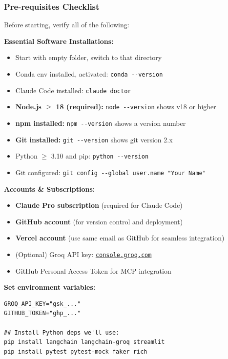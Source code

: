 \begin{frame}[fragile]\frametitle{Pre-requisites Checklist}
Before starting, verify all of the following:

\textbf{Essential Software Installations:}
  \begin{itemize}
    \item Start with empty folder, switch to that directory
    \item Conda env installed, activated: \lstinline|conda --version|
    \item Claude Code installed: \lstinline|claude doctor|
    \item \textbf{Node.js $\geq$ 18 (required):} \lstinline|node --version| shows v18 or higher
    \item \textbf{npm installed:} \lstinline|npm --version| shows a version number
    \item \textbf{Git installed:} \lstinline|git --version| shows git version 2.x
    \item Python $\geq$ 3.10 and pip: \lstinline|python --version|
    \item Git configured: \lstinline|git config --global user.name "Your Name"|
  \end{itemize}

\textbf{Accounts \& Subscriptions:}
  \begin{itemize}
    \item \textbf{Claude Pro subscription} (required for Claude Code)
    \item \textbf{GitHub account} (for version control and deployment)
    \item \textbf{Vercel account} (use same email as GitHub for seamless integration)
    \item (Optional) Groq API key: \href{https://console.groq.com}{\texttt{console.groq.com}}
    \item GitHub Personal Access Token for MCP integration
  \end{itemize}

\textbf{Set environment variables:}
\begin{lstlisting}
GROQ_API_KEY="gsk_..." 
GITHUB_TOKEN="ghp_..."

## Install Python deps we'll use:
pip install langchain langchain-groq streamlit 
pip install pytest pytest-mock faker rich
\end{lstlisting}
\end{frame}


